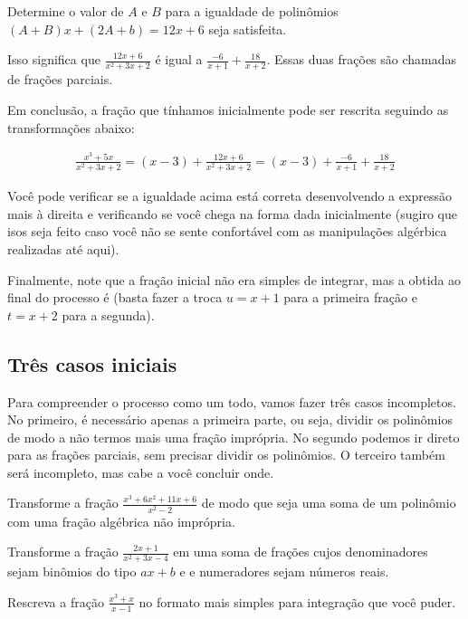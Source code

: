 \documentclass[main_estudante.tex]{subfiles}
\begin{document}
\begin{questao}
Determine o valor de $A$ e $B$ para a igualdade de polinômios $(A+B)x+(2A+b)=12x+6$ seja satisfeita.
\end{questao}

Isso significa que $\frac{12x+6}{x^2+3x+2}$ é igual a $\frac{-6}{x+1}+\frac{18}{x+2}$. Essas duas frações são chamadas de frações parciais.

Em conclusão, a fração que tínhamos inicialmente pode ser rescrita seguindo as transformações abaixo:

\begin{align*}
\frac{x^3+5x}{x^2+3x+2} = (x-3)+\frac{12x+6}{x^2+3x+2} = (x-3)+\frac{-6}{x+1}+\frac{18}{x+2}
\end{align*}

Você pode verificar se a igualdade acima está correta desenvolvendo a expressão mais à direita e verificando se você chega na forma dada inicialmente (sugiro que isos seja feito caso você não se sente confortável com as manipulações algérbica realizadas até aqui).

Finalmente, note que a fração inicial não era simples de integrar, mas a obtida ao final do processo é (basta fazer a troca $u=x+1$ para a primeira fração e $t=x+2$ para a segunda).

\subsection*{Três casos iniciais}

Para compreender o processo como um todo, vamos fazer três casos incompletos. No primeiro, é necessário apenas a primeira parte, ou seja, dividir os polinômios de modo a não termos mais uma fração imprópria. No segundo podemos ir direto para as frações parciais, sem precisar dividir os polinômios. O terceiro também será incompleto, mas cabe a você concluir onde.

\begin{questao}
Transforme a fração $\frac{x^3+6x^2+11x+6}{x^2-2}$ de modo que seja uma soma de um polinômio com uma fração algébrica não imprópria.
\end{questao}

\begin{questao}
Transforme a fração $\frac{2x+1}{x^2+3x-4}$ em uma soma de frações cujos denominadores sejam binômios do tipo $ax+b$ e e numeradores sejam números reais.
\end{questao}

\begin{questao}
Rescreva a fração $\frac{x^3+x}{x-1}$ no formato mais simples para integração que você puder.
\end{questao}
\end{document}
